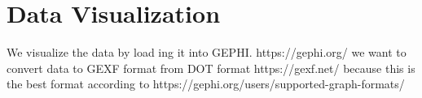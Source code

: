\section{\label{sec:visualization}Data Visualization}

We visualize the data by load ing it into GEPHI. https://gephi.org/
we want to convert data to GEXF format from DOT format https://gexf.net/ because this is the best format according to https://gephi.org/users/supported-graph-formats/

